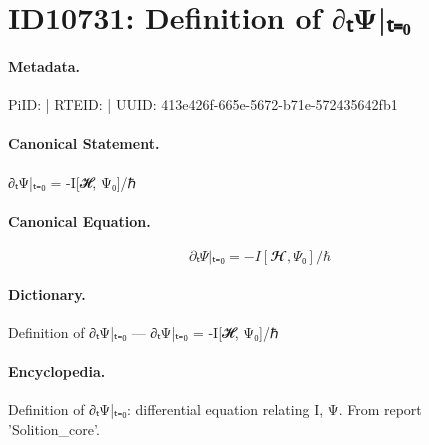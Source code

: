 \section*{ID10731: Definition of ∂ₜΨ|ₜ₌₀}
\paragraph{Metadata.}
PiID:  | RTEID:  | UUID: 413e426f-665e-5672-b71e-572435642fb1

\paragraph{Canonical Statement.}
∂ₜΨ|ₜ₌₀ = -I[𝓗, Ψ₀]/ℏ

\paragraph{Canonical Equation.}
\[
∂ₜΨ|ₜ₌₀ = -I[𝓗, Ψ₀]/ℏ
\]

\paragraph{Dictionary.}
Definition of ∂ₜΨ|ₜ₌₀ — ∂ₜΨ|ₜ₌₀ = -I[𝓗, Ψ₀]/ℏ

\paragraph{Encyclopedia.}
Definition of ∂ₜΨ|ₜ₌₀: differential equation relating I, Ψ. From report 'Solition\_core'.
